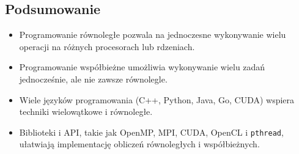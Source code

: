\subsection{Podsumowanie}
\begin{itemize}
    \item Programowanie równoległe pozwala na jednoczesne wykonywanie wielu operacji na różnych procesorach lub rdzeniach.
    \item Programowanie współbieżne umożliwia wykonywanie wielu zadań jednocześnie, ale nie zawsze równolegle.
    \item Wiele języków programowania (C++, Python, Java, Go, CUDA) wspiera techniki wielowątkowe i równoległe.
    \item Biblioteki i API, takie jak OpenMP, MPI, CUDA, OpenCL i \texttt{pthread}, ułatwiają implementację obliczeń równoległych i współbieżnych.
\end{itemize}
